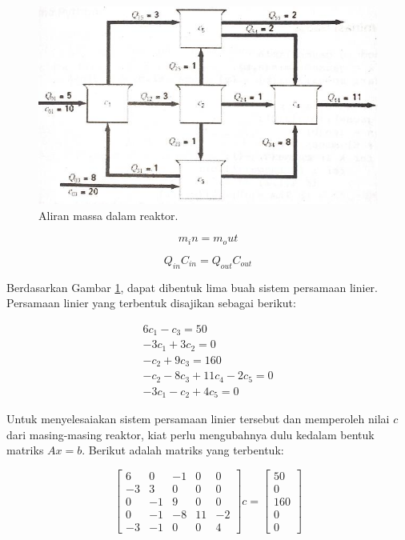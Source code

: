 \documentclass[]{book}
\theoremstyle{definition}
\theoremstyle{definition}
\theoremstyle{definition}
\theoremstyle{remark}
\begin{document}
\begin{figure}

{\centering \includegraphics[width=0.9\linewidth]{./images/reaktor} 

}

\caption{Aliran massa dalam reaktor.}\label{fig:reaktor}
\end{figure}

\begin{equation}
m_in=m_out
 \label{eq:steady}
\end{equation}

\begin{equation}
Q_{in}C_{in}= Q_{out}C_{out}
 \label{eq:steady2}
\end{equation}

Berdasarkan Gambar \ref{fig:reaktor}, dapat dibentuk lima buah sistem persamaan linier. Persamaan linier yang terbentuk disajikan sebagai berikut:

\[
\begin{matrix}
  6c_{1}-c_{3}=50 \\
  -3c_{1}+3c_{2}=0 \\
  -c_{2}+9c_{3}=160 \\
  -c_{2}-8c_{3}+11c_{4}-2c_{5}=0 \\
  -3c_{1}-c_{2}+4c_{5}=0
\end{matrix}
\]

Untuk menyelesaiakan sistem persamaan linier tersebut dan memperoleh nilai \(c\) dari masing-masing reaktor, kiat perlu mengubahnya dulu kedalam bentuk matriks \(Ax=b\). Berikut adalah matriks yang terbentuk:

\begin{equation*}
\begin{bmatrix}
      6 &  0 & -1 & 0  & 0    \\[0.3em]
     -3 &  3 & 0  & 0  & 0    \\[0.3em]
      0 & -1 & 9  & 0  & 0    \\[0.3em]
      0 & -1 & -8 & 11 & -2   \\[0.3em]
     -3 & -1 & 0  & 0  & 4
\end{bmatrix}
c = \begin{bmatrix}
     50     \\[0.3em]
     0      \\[0.3em]
     160    \\[0.3em]
     0      \\[0.3em]
     0
\end{bmatrix}
\end{equation*}
\end{document}
